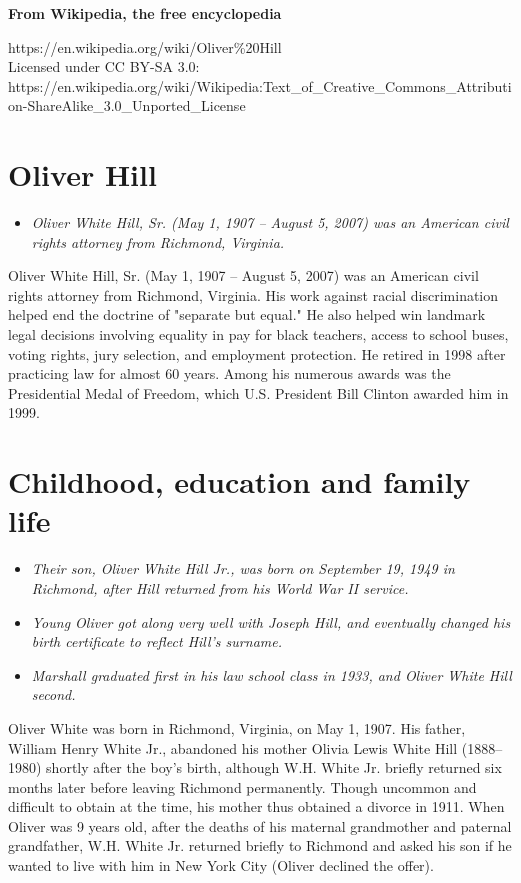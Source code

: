 \textbf{From Wikipedia, the free encyclopedia}

https://en.wikipedia.org/wiki/Oliver\%20Hill\\
Licensed under CC BY-SA 3.0:\\
https://en.wikipedia.org/wiki/Wikipedia:Text\_of\_Creative\_Commons\_Attribution-ShareAlike\_3.0\_Unported\_License

\section{Oliver Hill}\label{oliver-hill}

\begin{itemize}
\item
  \emph{Oliver White Hill, Sr. (May 1, 1907 -- August 5, 2007) was an
  American civil rights attorney from Richmond, Virginia.}
\end{itemize}

Oliver White Hill, Sr. (May 1, 1907 -- August 5, 2007) was an American
civil rights attorney from Richmond, Virginia. His work against racial
discrimination helped end the doctrine of "separate but equal." He also
helped win landmark legal decisions involving equality in pay for black
teachers, access to school buses, voting rights, jury selection, and
employment protection. He retired in 1998 after practicing law for
almost 60 years. Among his numerous awards was the Presidential Medal of
Freedom, which U.S. President Bill Clinton awarded him in 1999.

\section{Childhood, education and family
life}\label{childhood-education-and-family-life}

\begin{itemize}
\item
  \emph{Their son, Oliver White Hill Jr., was born on September 19, 1949
  in Richmond, after Hill returned from his World War II service.}
\item
  \emph{Young Oliver got along very well with Joseph Hill, and
  eventually changed his birth certificate to reflect Hill's surname.}
\item
  \emph{Marshall graduated first in his law school class in 1933, and
  Oliver White Hill second.}
\end{itemize}

Oliver White was born in Richmond, Virginia, on May 1, 1907. His father,
William Henry White Jr., abandoned his mother Olivia Lewis White Hill
(1888--1980) shortly after the boy's birth, although W.H. White Jr.
briefly returned six months later before leaving Richmond permanently.
Though uncommon and difficult to obtain at the time, his mother thus
obtained a divorce in 1911. When Oliver was 9 years old, after the
deaths of his maternal grandmother and paternal grandfather, W.H. White
Jr. returned briefly to Richmond and asked his son if he wanted to live
with him in New York City (Oliver declined the offer).

